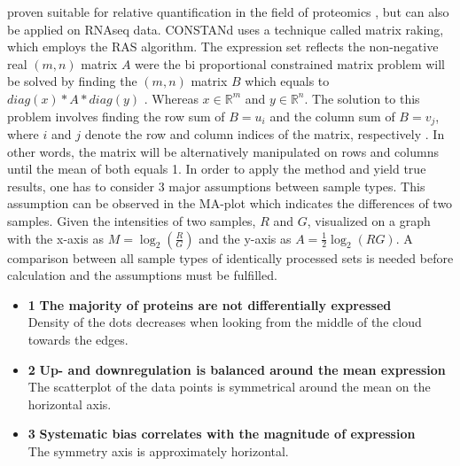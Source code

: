 \documentclass[
  11pt,
]{article}
\begin{document}
proven suitable for relative quantification in the field of proteomics
\citep{Maes2016, VanHoutven2021}, but can also be applied on RNAseq
data. CONSTANd uses a technique called matrix raking, which employs the
RAS algorithm. The expression set reflects the non-negative real
\((m, n)\) matrix \(A\) were the bi proportional constrained matrix
problem will be solved by finding the \((m, n)\) matrix \(B\) which
equals to \(diag(x) * A *diag(y)\) . Whereas \(x \in \mathbb{R}^{m}\)
and \(y \in \mathbb{R}^{n}\). The solution to this problem involves
finding the row sum of \(B=u_i\) and the column sum of \(B=v_j\), where
\(i\) and \(j\) denote the row and column indices of the matrix,
respectively \citep{Bacharach1965}. In other words, the matrix will be
alternatively manipulated on rows and columns until the mean of both
equals 1. In order to apply the method and yield true results, one has
to consider 3 major assumptions between sample types. This assumption
can be observed in the MA-plot which indicates the differences of two
samples. Given the intensities of two samples, \(R\) and \(G\),
visualized on a graph with the x-axis as \(M=\log_2(\frac{R}{G})\) and
the y-axis as \(A=\frac{1}{2}\log_2(RG)\). A comparison between all
sample types of identically processed sets is needed before calculation
and the assumptions must be fulfilled.

\begin{itemize}
\item{\textbf{1}} \textbf{The majority of proteins are not differentially expressed}
\\Density of the dots decreases when looking from the middle of the cloud towards the edges.

\item{\textbf{2}} \textbf{Up- and downregulation is balanced around the mean expression}
\\The scatterplot of the data points is symmetrical around the mean on the horizontal axis. 

\item{\textbf{3}} \textbf{Systematic bias correlates with the magnitude of expression}
\\The symmetry axis is approximately horizontal.

\end{itemize}
\end{document}
